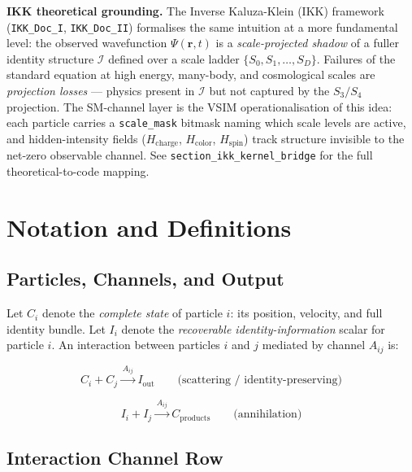 \documentclass[11pt,a4paper]{article}
\theoremstyle{defbox}
\begin{document}
\noindent\textbf{IKK theoretical grounding.}
The Inverse Kaluza-Klein (IKK) framework (\texttt{IKK\_Doc\_I}, \texttt{IKK\_Doc\_II})
formalises the same intuition at a more fundamental level: the observed
wavefunction $\Psi(\mathbf{r},t)$ is a \emph{scale-projected shadow} of a fuller
identity structure $\mathcal{I}$ defined over a scale ladder
$\{S_0, S_1, \ldots, S_D\}$.  Failures of the standard equation at high
energy, many-body, and cosmological scales are \emph{projection losses} ---
physics present in $\mathcal{I}$ but not captured by the $S_3/S_4$ projection.
The SM-channel layer is the VSIM operationalisation of this idea:
each particle carries a \texttt{scale\_mask} bitmask naming which scale levels
are active, and hidden-intensity fields ($H_\text{charge}$, $H_\text{color}$,
$H_\text{spin}$) track structure invisible to the net-zero observable channel.
See \texttt{section\_ikk\_kernel\_bridge} for the full theoretical-to-code mapping.

\section{Notation and Definitions}
\label{sec:notation}

\subsection{Particles, Channels, and Output}

Let $C_i$ denote the \emph{complete state} of particle $i$: its position,
velocity, and full identity bundle.  Let $I_i$ denote the
\emph{recoverable identity-information} scalar for particle $i$.  An
interaction between particles $i$ and $j$ mediated by channel $A_{ij}$ is:

\begin{equation}
  C_i + C_j \xrightarrow{\,A_{ij}\,} I_{\mathrm{out}}
  \qquad \text{(scattering / identity-preserving)}
\end{equation}

\begin{equation}
  I_i + I_j \xrightarrow{\,A_{ij}\,} C_{\mathrm{products}}
  \qquad \text{(annihilation)}
\end{equation}

\subsection{Interaction Channel Row}
\end{document}
